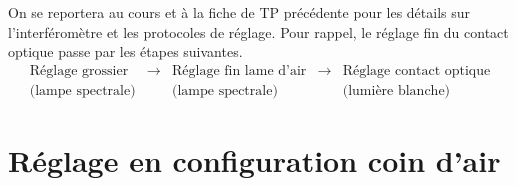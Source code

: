 {On se reportera au cours et à la fiche de TP précédente pour les détails sur l'interféromètre et les protocoles de réglage. Pour rappel, le réglage fin du contact optique passe par les étapes suivantes.
$$
\begin{array}{ccccc}
\text{Réglage grossier} & \rightarrow & \text{Réglage fin lame d’air} & \rightarrow & \text{Réglage contact optique} \\
\text{(lampe spectrale)} & & \text{(lampe spectrale)} &  & \text{(lumière blanche)}
\end{array}
$$
}

 \section{Réglage en configuration coin d'air}
